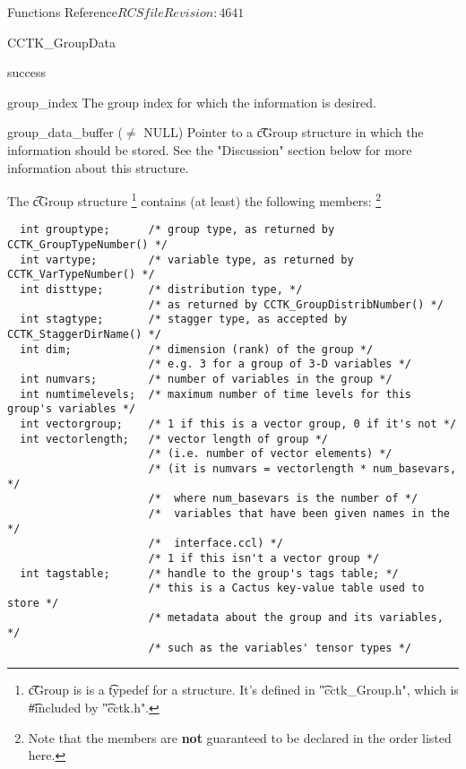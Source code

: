 \begin{cactuspart}{ Functions Reference}{$RCSfile$}{$Revision: 4641 $}
\begin{FunctionDescription}{CCTK\_GroupData}
\begin{ResultSection}
\begin{Result}{0}
success
\end{Result}
\end{ResultSection}

\begin{ParameterSection}
\begin{Parameter}{group\_index}
The group index for which the information is desired.
\end{Parameter}
\begin{Parameter}{group\_data\_buffer ($\ne$ NULL)}
Pointer to a {\t cGroup} structure in which the information should be
stored.  See the "Discussion" section below for more information about
this structure.
\end{Parameter}
\end{ParameterSection}

\begin{Discussion}
The {\t cGroup} structure%
\footnote{%
         {\t cGroup} is is a {\t typedef} for a structure.
         It's defined in {\t "cctk\_Group.h"}, which is
         {\t \#include}d by {\t "cctk.h"}.
         }%
{} contains (at least) the following members:%
\footnote{%
         Note that the members are {\bf not\/}
         guaranteed to be declared in the order
         listed here.
         }%
\begin{verbatim}
  int grouptype;      /* group type, as returned by CCTK_GroupTypeNumber() */
  int vartype;        /* variable type, as returned by CCTK_VarTypeNumber() */
  int disttype;       /* distribution type, */
                      /* as returned by CCTK_GroupDistribNumber() */
  int stagtype;       /* stagger type, as accepted by CCTK_StaggerDirName() */
  int dim;            /* dimension (rank) of the group */
                      /* e.g. 3 for a group of 3-D variables */
  int numvars;        /* number of variables in the group */
  int numtimelevels;  /* maximum number of time levels for this group's variables */
  int vectorgroup;    /* 1 if this is a vector group, 0 if it's not */
  int vectorlength;   /* vector length of group */
                      /* (i.e. number of vector elements) */
                      /* (it is numvars = vectorlength * num_basevars, */
                      /*  where num_basevars is the number of */
                      /*  variables that have been given names in the */
                      /*  interface.ccl) */
                      /* 1 if this isn't a vector group */
  int tagstable;      /* handle to the group's tags table; */
                      /* this is a Cactus key-value table used to store */
                      /* metadata about the group and its variables, */
                      /* such as the variables' tensor types */
\end{verbatim}
\end{Discussion}


\end{FunctionDescription}
\end{cactuspart}
